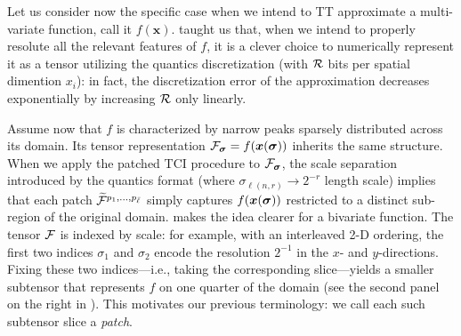 Let us consider now the specific case when we intend to TT approximate a multi-variate function, call it $f(\boldsymbol{x})$.  taught us that, when we intend to properly resolute all the relevant features of $f$, it is a clever choice to numerically represent it as a tensor utilizing the quantics discretization (with $\mathcal{R}$ bits per spatial dimention $x_i$): in fact, the discretization error of the approximation decreases exponentially by increasing $\mathcal{R}$ only linearly. 

Assume now that $f$ is characterized by narrow peaks sparsely distributed across its domain. Its tensor representation $\mathcal{F}_{\boldsymbol{\sigma}} = f(\boldsymbol{x}(\boldsymbol{\sigma}))$ inherits the same structure. When we apply the patched TCI procedure to $\mathcal{F}_{\boldsymbol{\sigma}}$, the scale separation introduced by the quantics format (where $\sigma_{\ell(n,r)} \to 2^{-r}$ length scale) implies that each patch $\widetilde{\mathcal{F}}^{p_1,\dots,p_{\bar \ell}}$ simply captures $f(\boldsymbol{x}(\boldsymbol{\sigma}))$ restricted to a distinct sub-region of the original domain.
 makes the idea clearer for a bivariate function.
The tensor $\mathcal{F}$ is indexed by scale: for example, with an interleaved 2-D ordering, the first two indices $\sigma_1$ and $\sigma_2$ encode the resolution $2^{-1}$ in the $x$- and $y$-directions. Fixing these two indices—i.e., taking the corresponding slice—yields a smaller subtensor that represents $f$ on one quarter of the domain (see the second panel on the right in ). This motivates our previous terminology: we call each such subtensor slice a \textit{patch}.
